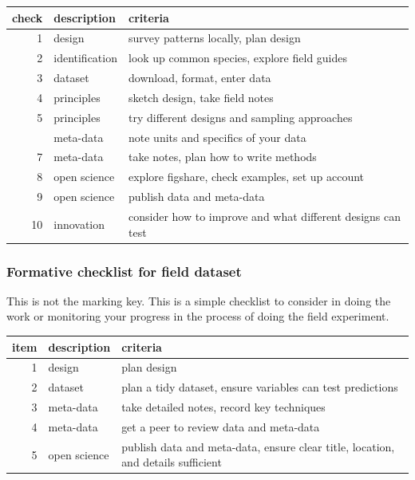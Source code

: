 \documentclass[
]{book}
\begin{document}
\begin{tabular}{rll}
\toprule
check & description & criteria\\
\midrule
1 & design & survey patterns locally, plan design\\
2 & identification & look up common species, explore field guides\\
3 & dataset & download, format, enter data\\
4 & principles & sketch design, take field notes\\
5 & principles & try different designs and sampling approaches\\
\addlinespace
6 & meta-data & note units and specifics of your data\\
7 & meta-data & take notes, plan how to write methods\\
8 & open science & explore figshare, check examples, set up account\\
9 & open science & publish data and meta-data\\
10 & innovation & consider how to improve and what different designs can test\\
\bottomrule
\end{tabular}

\hypertarget{formative-checklist-for-field-dataset}{%
\subsubsection*{Formative checklist for field dataset}\label{formative-checklist-for-field-dataset}}

This is not the marking key. This is a simple checklist to consider in doing the work or monitoring your progress in the process of doing the field experiment.

\begin{tabular}{rll}
\toprule
item & description & criteria\\
\midrule
1 & design & plan design\\
2 & dataset & plan a tidy dataset, ensure variables can test predictions\\
3 & meta-data & take detailed notes, record key techniques\\
4 & meta-data & get a peer to review data and meta-data\\
5 & open science & publish data and meta-data, ensure clear title, location, and details sufficient\\
\bottomrule
\end{tabular}
\end{document}
